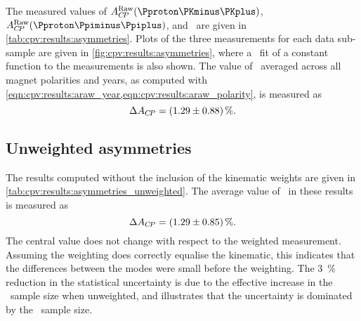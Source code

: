 The measured values of $\ARaw(\pKK)$, $\ARaw(\ppipi)$, and \dACP\ are given in 
\cref{tab:cpv:results:asymmetries}.
Plots of the three measurements for each data sub-sample are given in 
\cref{fig:cpv:results:asymmetries}, where a \chisq\ fit of a constant function 
to the measurements is also shown.
The value of \dACP\ averaged across all magnet polarities and years, as 
computed with \cref{eqn:cpv:results:araw_year,eqn:cpv:results:araw_polarity}, 
is measured as
\begin{equation*}
  \dACP = \deltaACP.
  \label{eqn:cpv:results:dacp}
\end{equation*}

\subsection{Unweighted asymmetries}

The results computed without the inclusion of the kinematic weights are given 
in \cref{tab:cpv:results:asymmetries_unweighted}.
The average value of \dACP\ in these results is measured as
\begin{equation*}
  \dACP = \deltaACPUnweighted.
\end{equation*}
The central value does not change with respect to the weighted measurement.
Assuming the weighting does correctly equalise the kinematic, this indicates 
that the differences between the modes were small before the weighting.
The \SI{3}{\percent} reduction in the statistical uncertainty is due to the 
effective increase in the \ppipi\ sample size when unweighted, and illustrates 
that the uncertainty is dominated by the \pKK\ sample size.

\begin{table}
  \centering
  \caption{%
    Measured asymmetries for each data sub-sample and combination of 
    sub-samples.
    The computation of the combinations, ``2011 + 2012'' and ``Average'', is 
    defined in \cref{chap:cpv:results:combination}.
  }
  \label{tab:cpv:results:asymmetries}
    
\end{table}

\begin{table}
  \centering
  \caption{%
    Measured asymmetries for each data sub-sample and combination of 
    sub-samples without the inclusion of the kinematic weights.
    The computation of the combinations, ``2011 + 2012'' and ``Average'', is 
    defined in \cref{chap:cpv:results:combination}.
  }
  \label{tab:cpv:results:asymmetries_unweighted}
    
\end{table}

